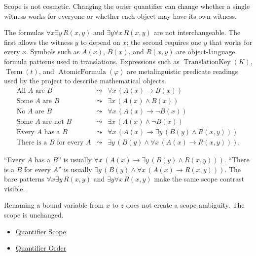 \begin{remark*}[Interpretation]
Scope is not cosmetic. Changing the outer quantifier can change whether a
single witness works for everyone or whether each object may have its own
witness.
\end{remark*}

\begin{remark*}[Exposition]
The formulas \(\forall x\exists y\,R(x,y)\) and
\(\exists y\forall x\,R(x,y)\) are not interchangeable. The first allows the
witness \(y\) to depend on \(x\); the second requires one \(y\) that works for
every \(x\). Symbols such as \(A(x)\), \(B(x)\), and \(R(x,y)\) are
object-language formula patterns used in translations. Expressions such as
\(\operatorname{TranslationKey}(K)\), \(\operatorname{Term}(t)\), and
\(\operatorname{AtomicFormula}(\varphi)\) are metalinguistic predicate readings
used by the project to describe mathematical objects.
\[
\begin{array}{lll}
\text{All }A\text{ are }B
  &\leadsto& \forall x\,(A(x)\to B(x))\\
\text{Some }A\text{ are }B
  &\leadsto& \exists x\,(A(x)\land B(x))\\
\text{No }A\text{ are }B
  &\leadsto& \forall x\,(A(x)\to \neg B(x))\\
\text{Some }A\text{ are not }B
  &\leadsto& \exists x\,(A(x)\land \neg B(x))\\
\text{Every }A\text{ has a }B
  &\leadsto& \forall x\,(A(x)\to \exists y\,(B(y)\land R(x,y)))\\
\text{There is a }B\text{ for every }A
  &\leadsto& \exists y\,(B(y)\land \forall x\,(A(x)\to R(x,y))).
\end{array}
\]
\end{remark*}

\begin{remark*}[Examples]
``Every \(A\) has a \(B\)'' is usually
\(\forall x\,(A(x)\to \exists y\,(B(y)\land R(x,y)))\). ``There is a \(B\) for
every \(A\)'' is usually
\(\exists y\,(B(y)\land \forall x\,(A(x)\to R(x,y)))\). The bare patterns
\(\forall x\exists y\,R(x,y)\) and \(\exists y\forall x\,R(x,y)\) make the same
scope contrast visible.
\end{remark*}

\begin{remark*}
Renaming a bound variable from \(x\) to \(z\) does not create a scope ambiguity.
The scope is unchanged.
\end{remark*}

\begin{dependencies}
\begin{itemize}
  \item \hyperref[def:quantifier-scope]{Quantifier Scope}
  \item \hyperref[def:q-alt]{Quantifier Order}
\end{itemize}
\end{dependencies}
